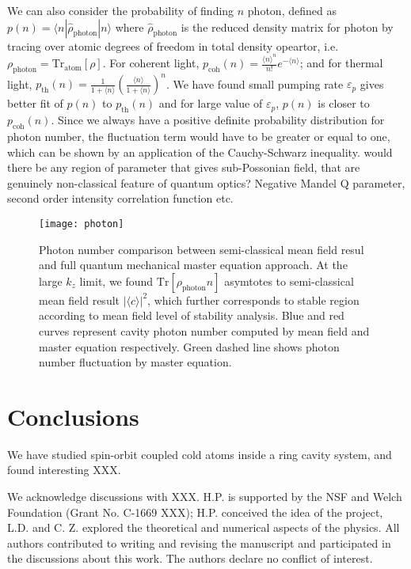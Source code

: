 \documentclass[atoms,article,submit,moreauthors,pdftex,12pt,a4paper]{mdpi}
\begin{document}
We can also consider the probability of finding $n$ photon, defined as $p(n)=\langle n|\hat{\rho}_{\text{photon}}|n\rangle$ where $\hat{\rho}_{\text{photon}}$ is the reduced density matrix for photon by tracing over atomic degrees of freedom in total density opeartor, i.e. $\rho_{\text{photon}}=\text{Tr}_{\text{atom}}[\rho]$. For coherent light, $p_{\text{coh}}(n)=\frac{\langle n\rangle^{n}}{n!}e^{-\langle n\rangle}$; and for thermal light, $p_{\text{th}}(n)=\frac{1}{1+\langle n\rangle}(\frac{\langle n\rangle}{1+\langle n\rangle})^{n}$. We have found small pumping rate $\varepsilon_p$ gives better fit of $p(n)$ to  $p_{\text{th}}(n)$ and for large value of $\varepsilon_p$, $p(n)$ is closer to $p_{\text{coh}}(n)$. Since we always have a positive definite probability distribution for photon number, the fluctuation term would have to be greater or equal to one, which can be shown by an application of the Cauchy-Schwarz inequality.
 {\color{red} would there be any region of parameter that gives sub-Possonian field, that are genuinely non-classical feature of quantum optics? Negative Mandel Q parameter, second order intensity correlation function etc.}



\begin{figure}[htp]
\texttt{[image: photon]}
\caption{ Photon number comparison between semi-classical mean field resul and full quantum mechanical master equation approach. At the large $k_z$ limit, we found $\text{Tr}[\rho_\text{photon}n]$ asymtotes to semi-classical mean field result $|\langle c\rangle|^2$, which further corresponds to stable region according to mean field level of stability analysis. Blue and red curves represent cavity photon number computed by mean field and master equation respectively. Green dashed line shows photon number fluctuation by master equation.}
\label{photon}
\end{figure}



\section{Conclusions} \label{conclusion}

We have studied spin-orbit coupled cold atoms inside a ring cavity system, and found interesting XXX.

We acknowledge discussions with XXX. H.P. is supported by the NSF and Welch Foundation (Grant No. C-1669 XXX);
H.P. conceived the idea of the project, L.D. and C. Z. explored the theoretical and numerical aspects of the physics. All authors contributed to writing and revising the manuscript and participated in the discussions about this work.
The authors declare no conflict of interest. 
\end{document}
